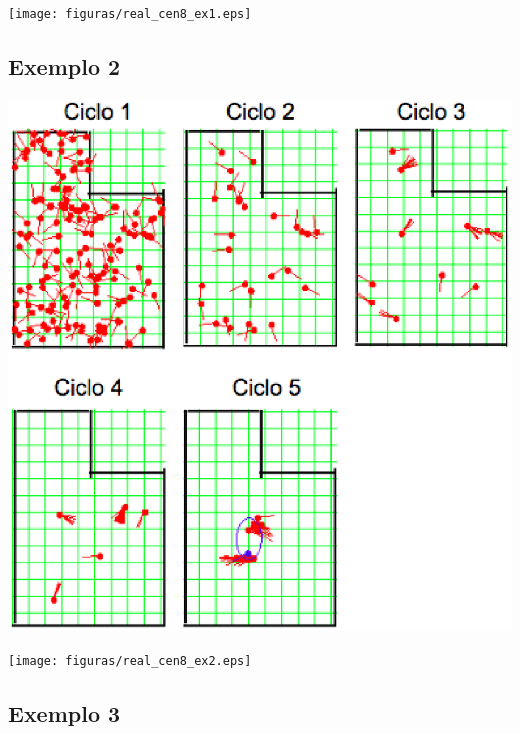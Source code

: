 {\centering
\texttt{[image: figuras/real\_cen8\_ex1.eps]}
\label{img:real_cen8_ex1}
\par}

\subsection{Exemplo 2}

{\centering
\includegraphics[scale=0.4]{figuras/cen8_ex2.eps}
\label{img:cen8_ex2}
\par}

{\centering
\texttt{[image: figuras/real\_cen8\_ex2.eps]}
\label{img:real_cen8_ex2}
\par}

\subsection{Exemplo 3}

